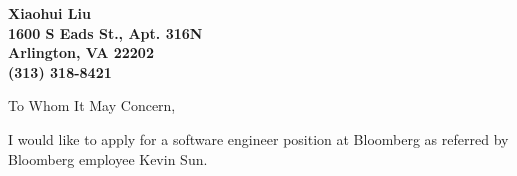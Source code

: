 \documentclass[12pt]{letter} %
\newcommand{\company}{Bloomberg}
\begin{document}

\begin{letter}
	{}


\begin{center}
\large\bf Xiaohui Liu \\ %
1600 S Eads St., Apt. 316N \\ Arlington, VA 22202 \\ (313) 318-8421 %
\end{center} 
\vfill

\signature{Xiaohui Liu} %


\opening{To Whom It May Concern,}

I would like to apply for a software engineer position at \company{}
 as referred by \company{} employee  Kevin Sun. %


\end{letter}
\end{document}
